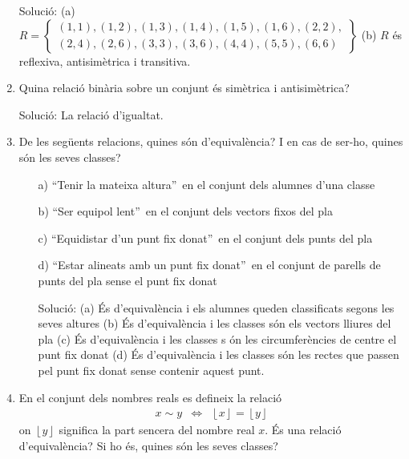 \begin{enumerate}
Soluci\'{o}: (a) $R=\left\{
\begin{array}{c}
(1,1),(1,2),(1,3),(1,4),(1,5),(1,6),(2,2), \\
(2,4),(2,6),(3,3),(3,6),(4,4),(5,5),(6,6)%
\end{array}%
\right\} $ (b) $R$ \'{e}s reflexiva, antisim\`{e}trica i transitiva.

\item Quina relaci\'{o} bin\`{a}ria sobre un conjunt \'{e}s sim\`{e}trica i
antisim\`{e}trica?

Soluci\'{o}: La relaci\'{o} d'igualtat.

\item De les seg\"{u}ents relacions, quines s\'{o}n d'equival\`{e}ncia? I en
cas de ser-ho, quines s\'{o}n les seves classes?

\begin{enumerate}
\item[a)] \textquotedblleft Tenir la mateixa altura\textquotedblright\ en el
conjunt dels alumnes d'una classe

\item[b)] \textquotedblleft Ser equipol\textperiodcentered
lent\textquotedblright\ en el conjunt dels vectors fixos del pla

\item[c)] \textquotedblleft Equidistar d'un punt fix
donat\textquotedblright\ en el conjunt dels punts del pla

\item[d)] \textquotedblleft Estar alineats amb un punt fix
donat\textquotedblright\ en el conjunt de parells de punts del pla sense el
punt fix donat

Soluci\'{o}: (a) \'{E}s d'equival\`{e}ncia i els alumnes queden classificats
segons les seves altures (b) \'{E}s d'equival\`{e}ncia i les classes s\'{o}n
els vectors lliures del pla (c) \'{E}s d'equival\`{e}ncia i les classes s%
\'{o}n les circumfer\`{e}ncies de centre el punt fix donat (d) \'{E}s
d'equival\`{e}ncia i les classes s\'{o}n les rectes que passen pel punt fix
donat sense contenir aquest punt.
\end{enumerate}

\item En el conjunt dels nombres reals es defineix la relaci\'{o}%
\begin{equation*}
\begin{array}{ccc}
x\sim y & \Longleftrightarrow & \left\lfloor x\right\rfloor =\left\lfloor
y\right\rfloor%
\end{array}%
\end{equation*}%
on $\left\lfloor y\right\rfloor $ significa la part sencera del nombre real $%
x$. \'{E}s una relaci\'{o} d'equival\`{e}ncia? Si ho \'{e}s, quines s\'{o}n
les seves classes?


\end{enumerate}
